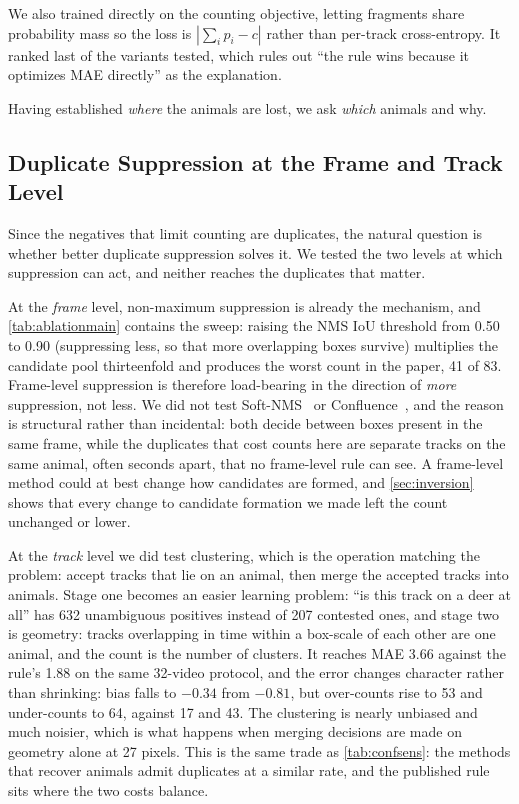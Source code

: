 We also trained directly on the counting objective, letting fragments share probability mass
so the loss is $|\sum_i p_i - c|$ rather than per-track cross-entropy. It ranked last of the variants tested, which rules out ``the rule wins because it optimizes MAE directly'' as the
explanation.

Having established \emph{where} the animals are lost, we ask \emph{which} animals and why.

\subsection{Duplicate Suppression at the Frame and Track Level}
\label{sec:nms}

Since the negatives that limit counting are duplicates, the natural question is whether
better duplicate suppression solves it. We tested the two levels at which suppression can
act, and neither reaches the duplicates that matter.

At the \emph{frame} level, non-maximum suppression is already the mechanism, and
\cref{tab:ablationmain} contains the sweep: raising the NMS IoU threshold from 0.50 to 0.90 (suppressing less, so that more overlapping boxes survive) multiplies the candidate pool
thirteenfold and produces the worst count in the paper, 41 of 83. Frame-level suppression is
therefore load-bearing in the direction of \emph{more} suppression, not less. We did not test
Soft-NMS~\cite{bodla2017softnms} or Confluence~\cite{shuai2021confluence}, and the reason is
structural rather than incidental: both decide between boxes present in the same frame, while
the duplicates that cost counts here are separate tracks on the same animal, often seconds
apart, that no frame-level rule can see. A frame-level method could at best change how
candidates are formed, and \cref{sec:inversion} shows that every change to candidate formation
we made left the count unchanged or lower.

At the \emph{track} level we did test clustering, which is the operation matching the problem:
accept tracks that lie on an animal, then merge the accepted tracks into animals. Stage one becomes an easier learning problem: ``is this track on a deer at all'' has 632 unambiguous
positives instead of 207 contested ones, and stage two is geometry: tracks overlapping in
time within a box-scale of each other are one animal, and the count is the number of clusters.
It reaches MAE 3.66 against the rule's 1.88 on the same 32-video protocol, and the error
changes character rather than shrinking: bias falls to $-0.34$ from $-0.81$, but over-counts
rise to 53 and under-counts to 64, against 17 and 43. The clustering is nearly unbiased and
much noisier, which is what happens when merging decisions are made on geometry alone at 27
pixels. This is the same trade as \cref{tab:confsens}: the methods that recover animals admit
duplicates at a similar rate, and the published rule sits where the two costs balance.

